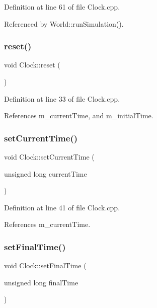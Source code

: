 Definition at line 61 of file Clock.\+cpp.



Referenced by World\+::run\+Simulation().

\mbox{\label{class_clock_a0ab5423b0a997aa13d7b6131c46d1358}} 
\subsubsection{reset()}
{\footnotesize\ttfamily void Clock\+::reset (\begin{DoxyParamCaption}{ }\end{DoxyParamCaption})}



Definition at line 33 of file Clock.\+cpp.



References m\+\_\+current\+Time, and m\+\_\+initial\+Time.

\mbox{\label{class_clock_a7046e8733ab749d3c24b3c61bd108d6c}} 
\subsubsection{set\+Current\+Time()}
{\footnotesize\ttfamily void Clock\+::set\+Current\+Time (\begin{DoxyParamCaption}\item[{unsigned long}]{current\+Time }\end{DoxyParamCaption})}



Definition at line 41 of file Clock.\+cpp.



References m\+\_\+current\+Time.

\mbox{\label{class_clock_a4780f83b55bc2539cd7069cfc4f06d99}} 
\subsubsection{set\+Final\+Time()}
{\footnotesize\ttfamily void Clock\+::set\+Final\+Time (\begin{DoxyParamCaption}\item[{unsigned long}]{final\+Time }\end{DoxyParamCaption})}




